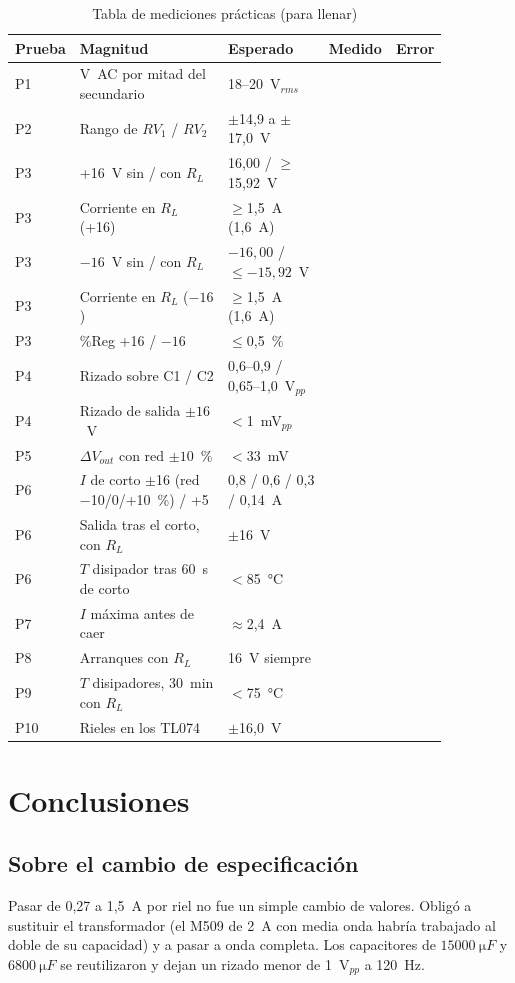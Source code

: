 \documentclass[conference]{IEEEtran}
\begin{document}
\begin{table}[htbp]
\caption{Tabla de mediciones prácticas (para llenar)}
\label{tab:med}
\centering
\scriptsize\setlength{\tabcolsep}{3pt}
\begin{tabular}{@{}p{0.08\linewidth}p{0.36\linewidth}p{0.24\linewidth}p{0.11\linewidth}p{0.07\linewidth}@{}}
\toprule
Prueba & Magnitud & Esperado & Medido & Error \\
\midrule
P1 & V~AC por mitad del secundario & 18--20~V$_{rms}$ & & \\
P2 & Rango de $RV_1$ / $RV_2$ & $\pm$14,9 a $\pm$17,0~V & & \\
P3 & +16~V sin / con $R_L$ & 16,00 / $\geq$15,92~V & & \\
P3 & Corriente en $R_L$ (+16) & $\geq$1,5~A (1,6~A) & & \\
P3 & $-16$~V sin / con $R_L$ & $-16{,}00$ / $\leq-15{,}92$~V & & \\
P3 & Corriente en $R_L$ ($-16$) & $\geq$1,5~A (1,6~A) & & \\
P3 & \%Reg +16 / $-16$ & $\leq$0,5~\% & & \\
P4 & Rizado sobre C1 / C2 & 0,6--0,9 / 0,65--1,0~V$_{pp}$ & & \\
P4 & Rizado de salida $\pm16$~V & $<$1~mV$_{pp}$ & & \\
P5 & $\Delta V_{out}$ con red $\pm10$~\% & $<$33~mV & & \\
P6 & $I$ de corto $\pm$16 (red $-$10/0/+10~\%) / +5 & 0,8 / 0,6 / 0,3 / 0,14~A & & \\
P6 & Salida tras el corto, con $R_L$ & $\pm$16~V & & \\
P6 & $T$ disipador tras 60~s de corto & $<$85~°C & & \\
P7 & $I$ máxima antes de caer & $\approx$2,4~A & & \\
P8 & Arranques con $R_L$ & 16~V siempre & & \\
P9 & $T$ disipadores, 30~min con $R_L$ & $<$75~°C & & \\
P10 & Rieles en los TL074 & $\pm$16,0~V & & \\
\bottomrule
\end{tabular}
\end{table}

\section{Conclusiones}
\subsection{Sobre el cambio de especificación}
Pasar de 0,27 a 1,5~A por riel no fue un simple cambio de valores. Obligó a sustituir el transformador (el M509 de 2~A con media onda habría trabajado al doble de su capacidad) y a pasar a onda completa. Los capacitores de $\SI{15000}{\micro F}$ y $\SI{6800}{\micro F}$ se reutilizaron y dejan un rizado menor de 1~V$_{pp}$ a 120~Hz.
\end{document}
